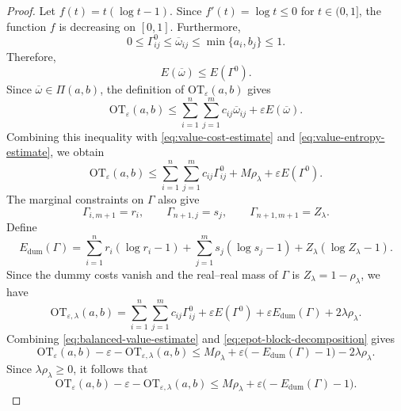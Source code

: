 \documentclass[a4paper,11pt]{article}
\numberwithin{equation}{section}
\newcommand{\eps}{\varepsilon}
\newcommand{\OT}{\mathrm{OT}}
\begin{document}
\begin{proof}
Let $f(t)=t(\log t-1)$. Since $f'(t)=\log t\leq0$ for $t\in(0,1]$, the function $f$ is decreasing on $[0,1]$. Furthermore,
\begin{equation*}
  0\leq\Gamma^0_{ij}\leq\overline\omega_{ij}\leq\min\{a_i,b_j\}\leq1.
\end{equation*}
Therefore,
\begin{equation}\label{eq:value-entropy-estimate}
  E(\overline\omega) \leq E(\Gamma^0).
\end{equation}
Since $\overline\omega\in\Pi(a,b)$, the definition of $\OT_{\eps}(a,b)$ gives
\begin{equation*}
  \OT_{\eps}(a,b) \leq \sum_{i = 1}^{n}\sum_{j = 1}^{m}c_{ij}\overline\omega_{ij} + \eps E(\overline\omega).
\end{equation*}
Combining this inequality with \eqref{eq:value-cost-estimate} and \eqref{eq:value-entropy-estimate}, we obtain
\begin{equation}\label{eq:balanced-value-estimate}
  \OT_{\eps}(a,b) \leq \sum_{i = 1}^{n}\sum_{j = 1}^{m}c_{ij}\Gamma^0_{ij} + M\rho_{\lambda} + \eps E(\Gamma^0).
\end{equation}
The marginal constraints on $\Gamma$ also give
\begin{equation*}
  \Gamma_{i,m+1}=r_i,\qquad \Gamma_{n+1,j}=s_j,\qquad \Gamma_{n+1,m+1}=Z_{\lambda}.
\end{equation*}
Define
\begin{equation*}
  E_{\mathrm{dum}}(\Gamma) = \sum_{i = 1}^{n}r_i(\log r_i-1) + \sum_{j = 1}^{m}s_j(\log s_j-1) + Z_{\lambda}(\log Z_{\lambda}-1).
\end{equation*}
Since the dummy costs vanish and the real--real mass of $\Gamma$ is $Z_{\lambda}=1-\rho_{\lambda}$, we have
\begin{equation}\label{eq:epot-block-decomposition}
  \OT_{\eps,\lambda}(a,b) = \sum_{i = 1}^{n}\sum_{j = 1}^{m}c_{ij}\Gamma^0_{ij} + \eps E(\Gamma^0) + \eps E_{\mathrm{dum}}(\Gamma) + 2\lambda\rho_{\lambda}.
\end{equation}
Combining \eqref{eq:balanced-value-estimate} and \eqref{eq:epot-block-decomposition} gives
\begin{equation*}
  \OT_{\eps}(a,b)-\eps-\OT_{\eps,\lambda}(a,b) \leq M\rho_{\lambda} + \eps\bigl(-E_{\mathrm{dum}}(\Gamma)-1\bigr) - 2\lambda\rho_{\lambda}.
\end{equation*}
Since $\lambda\rho_{\lambda}\geq0$, it follows that
\begin{equation}\label{eq:value-gap-entropy}
  \OT_{\eps}(a,b)-\eps-\OT_{\eps,\lambda}(a,b) \leq M\rho_{\lambda} + \eps\bigl(-E_{\mathrm{dum}}(\Gamma)-1\bigr).

\end{equation}
\end{proof}
\end{document}
